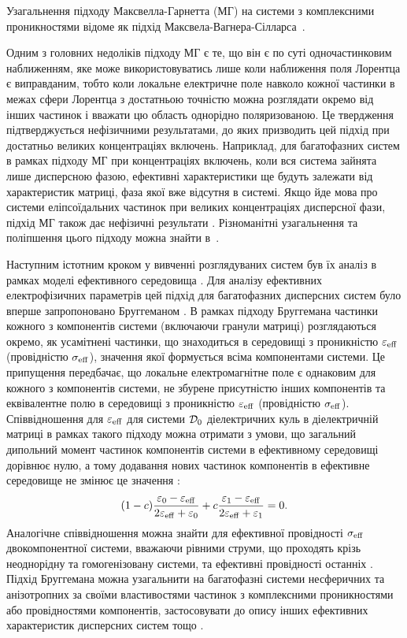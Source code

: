 \documentclass[14pt,twoside]{vakthesis}
\begin{document}
Узагальнення підходу Максвелла-Гарнетта (МГ) на системи з комплексними  проникностями відоме як підхід Максвела-Вагнера-Сілларса~\cite{Wagner1914, Sillars1937}.

Одним з головних недоліків підходу МГ є те, що він є по суті одночастинковим наближенням, яке може використовуватись лише коли
наближення поля Лорентца є виправданим, тобто коли локальне електричне поле навколо кожної частинки в межах сфери Лорентца з достатньою точністю можна розглядати окремо від інших частинок і вважати цю область однорідно поляризованою. Це твердження підтверджується нефізичними результатами, до яких призводить цей підхід при достатньо великих концентраціях включень. Наприклад, для багатофазних систем в рамках підходу МГ при концентраціях включень, коли вся система зайнята лише дисперсною фазою, ефективні характеристики ще будуть залежати від характеристик матриці, фаза якої вже відсутня в системі. Якщо йде мова про системи еліпсоїдальних частинок при великих концентраціях дисперсної фази, підхід МГ також дає нефізичні результати \cite{Choy}.
Різноманітні узагальнення та поліпшення цього підходу можна 
знайти в~\cite{Sihvola2000}. 

Наступним істотним кроком у вивченні розглядуваних систем був їх аналіз в рамках моделі ефективного середовища \cite{Biot1806}. Для аналізу ефективних електрофізичних параметрів цей підхід для багатофазних дисперсних систем було вперше запропоновано Бруггеманом \cite{Bruggeman1935}. В рамках підходу Бруггемана частинки кожного з компонентів  системи (включаючи гранули матриці) розглядаються окремо, як усамітнені частинки, що знаходиться в середовищі з проникністю $\varepsilon_{\rm eff}$ (провідністю $\sigma_{\rm eff}$), значення якої формується всіма компонентами системи.
Це припущення передбачає, що локальне електромагнітне поле є однаковим для кожного з компонентів системи, не збурене присутністю інших компонентів та еквівалентне полю в середовищі з проникністю $\varepsilon_{\rm eff}$ (провідністю $\sigma_{\rm eff}$).
Співвідношення для $\varepsilon_{\rm eff}$ для  системи ${\cal D}_0$ діелектричних куль в діелектричній матриці в рамках такого підходу можна отримати з умови, що загальний дипольний момент частинок компонентів системи в ефективному середовищі дорівнює нулю, а тому додавання нових частинок компонентів в ефективне середовище не змінює це значення \cite{Ross2004, Bruggeman1935, Landauer1952, Ross2004, Torquato}:
\begin{equation}\label{eq:EMA}
(1-c) \frac{\varepsilon_0 - \varepsilon_{\rm eff}}{2\varepsilon_{\rm
		eff} + \varepsilon_0} + c \frac{\varepsilon_1 -
	\varepsilon_{\rm eff}}{2\varepsilon_{\rm eff} + \varepsilon_1} = 0.
\end{equation}
Аналогічне співвідношення можна знайти для ефективної провідності $\sigma_{\rm eff}$ двокомпонентної системи, вважаючи рівними струми, що проходять крізь неоднорідну та гомогенізовану системи, та ефективні провідності останніх \cite{Landauer1952, Torquato}.
Підхід Бруггемана можна узагальнити на багатофазні системи несферичних та анізотропних за своїми властивостями частинок з комплексними проникностями або провідностями компонентів, застосовувати до опису інших ефективних характеристик дисперсних систем тощо \cite{Choy, Sihvola1999, Torquato, Mackay}. 
\end{document}
